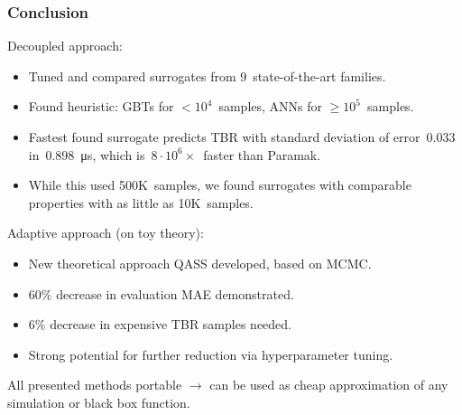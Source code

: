 \begin{frame}
	\frametitle{Conclusion}

	Decoupled approach:

	\begin{itemize}
		\item
			Tuned and compared surrogates from \alert{9~state-of-the-art
			families}.
		\item
			Found heuristic: \alert{GBTs} for $<10^4$~samples,
			\alert{ANNs} for $\geq10^5$~samples.
		\item
			Fastest found surrogate predicts TBR with standard deviation of
			error~$\num{0.033}$ in~\SI{0.898}{\micro\second}, which is~\alert{$8\cdot
			10^6\times$~faster} than Paramak.
		\item
			While this used 500K~samples, we found surrogates with
			comparable properties with \alert{as little as 10K~samples}.
	\end{itemize}

	\vspace{0.5em}

	Adaptive approach (on toy theory):
	\begin{itemize}
	    \item
	        New theoretical approach QASS developed, based on MCMC.
		\item 
			\alert{$60\%$ decrease} in evaluation MAE demonstrated.
		\item
			\alert{$6\%$ decrease} in expensive TBR samples needed.
		\item
			Strong potential for further reduction via hyperparameter tuning.
	\end{itemize}

	\vspace{0.5em}

	All presented methods \alert{portable} $\longrightarrow$ can be used as cheap
	approximation of any simulation or black box function.
\end{frame}

